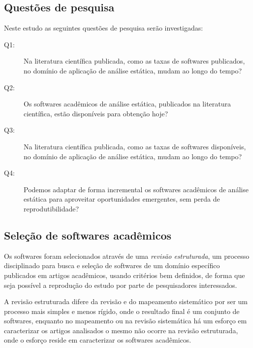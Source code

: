\subsection{Questões de pesquisa}

Neste estudo as seguintes questões de pesquisa serão investigadas:

\newcommand{\QuestaoUm}{Na literatura científica publicada, como as taxas de
softwares publicados, no domínio de aplicação de análise estática, mudam ao
longo do tempo?}

\newcommand{\QuestaoDois}{Os softwares acadêmicos de análise estática, publicados
na literatura científica, estão disponíveis para obtenção hoje?}

\newcommand{\QuestaoTres}{Na literatura científica publicada, como as taxas de
softwares disponíveis, no domínio de aplicação de análise estática, mudam ao
longo do tempo?}

\newcommand{\QuestaoQuatro}{Podemos adaptar de forma incremental os softwares
acadêmicos de análise estática para aproveitar oportunidades emergentes, sem
perda de reprodutibilidade?}

\begin{description}
  \item [Q1:] \QuestaoUm
  \item [Q2:] \QuestaoDois
  \item [Q3:] \QuestaoTres
  \item [Q4:] \QuestaoQuatro
\end{description}

\subsection{Seleção de softwares acadêmicos}

Os softwares foram selecionados através de uma {\it revisão estruturada}, um processo disciplinado
para busca e seleção de softwares de um domínio específico publicados em
artigos acadêmicos, usando critérios bem definidos, de forma que seja
possível a reprodução do estudo por parte de pesquisadores interessados.

A revisão estruturada difere da revisão e do mapeamento sistemático
\cite{Kitchenham2007} por ser um processo mais simples e menos rígido, onde o
resultado final é um conjunto de softwares, enquanto no mapeamento ou na
revisão sistemática há um esforço em caracterizar os artigos analisados o mesmo
não ocorre na revisão estruturada, onde o esforço reside em caracterizar os
softwares acadêmicos.

